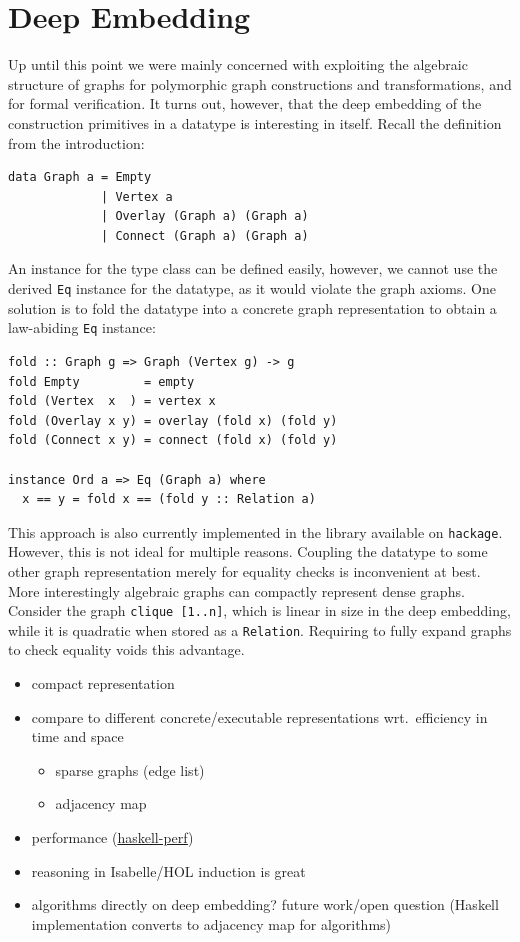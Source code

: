 \documentclass{article}
\newcommand{\hs}{\texttt}
\begin{document}
\section{Deep Embedding}\label{sec:deep}
Up until this point we were mainly concerned with exploiting the algebraic
structure of graphs for polymorphic graph constructions and transformations, and
for formal verification. It turns out, however, that the deep embedding of the
construction primitives in a datatype is interesting in itself. Recall the
definition from the introduction:
\begin{verbatim}
data Graph a = Empty
             | Vertex a
             | Overlay (Graph a) (Graph a)
             | Connect (Graph a) (Graph a)
\end{verbatim}
An instance for the type class can be defined easily, however, we cannot use the
derived \hs{Eq} instance for the datatype, as it would violate the graph axioms.
One solution is to fold the datatype into a concrete graph representation to
obtain a law-abiding \hs{Eq} instance:
\begin{verbatim}
fold :: Graph g => Graph (Vertex g) -> g
fold Empty         = empty
fold (Vertex  x  ) = vertex x
fold (Overlay x y) = overlay (fold x) (fold y)
fold (Connect x y) = connect (fold x) (fold y)

instance Ord a => Eq (Graph a) where
  x == y = fold x == (fold y :: Relation a)
\end{verbatim}
This approach is also currently implemented in the library available on
\texttt{hackage}. However, this is not ideal for multiple reasons. Coupling the
datatype to some other graph representation merely for equality checks is
inconvenient at best. More interestingly algebraic graphs can compactly
represent dense graphs. Consider the graph \hs{clique [1..n]}, which is linear
in size in the deep embedding, while it is quadratic when stored as a
\hs{Relation}. Requiring to fully expand graphs to check equality voids this
advantage.
\begin{itemize}
\item compact representation
\item compare to different concrete/executable representations wrt.\ efficiency
  in time and space 
  \begin{itemize}
  \item sparse graphs (edge list)
  \item adjacency map
  \end{itemize}
\item performance (\href{https://github.com/haskell-perf/graphs}{haskell-perf})
\item reasoning in Isabelle/HOL \textrightarrow{} induction is great
\item algorithms directly on deep embedding? \textrightarrow{} future work/open
  question (Haskell implementation converts to adjacency map for algorithms)
\end{itemize}
\end{document}
